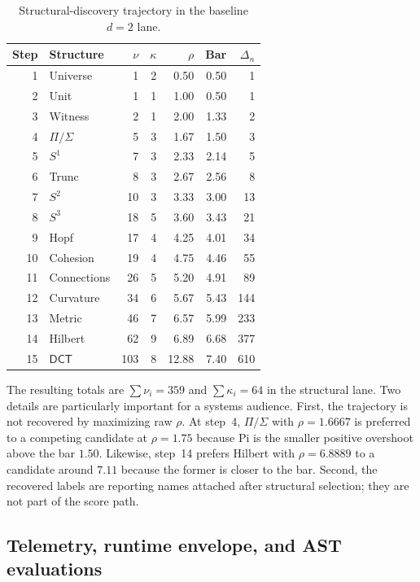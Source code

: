 \documentclass[pdflatex,sn-mathphys,Numbered]{sn-jnl}
\theoremstyle{thmstyleone}
\theoremstyle{thmstylethree}
\theoremstyle{thmstyletwo}
\newcommand{\DCT}{\ensuremath{\mathsf{DCT}}}
\newcommand{\Sone}{S^1}
\newcommand{\Stwo}{S^2}
\newcommand{\Sthree}{S^3}
\begin{document}
\begin{table}[p]
\centering
\caption{Structural-discovery trajectory in the baseline $d=2$ lane.}
\label{tab:trajectory}
\footnotesize
\begin{tabular}{@{}r l r r r r r@{}}
\toprule
Step & Structure & $\nu$ & $\kappa$ & $\rho$ & Bar & $\Delta_n$ \\
\midrule
1 & Universe & 1 & 2 & 0.50 & 0.50 & 1 \\
2 & Unit & 1 & 1 & 1.00 & 0.50 & 1 \\
3 & Witness & 2 & 1 & 2.00 & 1.33 & 2 \\
4 & $\Pi/\Sigma$ & 5 & 3 & 1.67 & 1.50 & 3 \\
5 & $\Sone$ & 7 & 3 & 2.33 & 2.14 & 5 \\
6 & Trunc & 8 & 3 & 2.67 & 2.56 & 8 \\
7 & $\Stwo$ & 10 & 3 & 3.33 & 3.00 & 13 \\
8 & $\Sthree$ & 18 & 5 & 3.60 & 3.43 & 21 \\
9 & Hopf & 17 & 4 & 4.25 & 4.01 & 34 \\
10 & Cohesion & 19 & 4 & 4.75 & 4.46 & 55 \\
11 & Connections & 26 & 5 & 5.20 & 4.91 & 89 \\
12 & Curvature & 34 & 6 & 5.67 & 5.43 & 144 \\
13 & Metric & 46 & 7 & 6.57 & 5.99 & 233 \\
14 & Hilbert & 62 & 9 & 6.89 & 6.68 & 377 \\
15 & \DCT{} & 103 & 8 & 12.88 & 7.40 & 610 \\
\bottomrule
\end{tabular}
\end{table}

The resulting totals are $\sum \nu_i = 359$ and $\sum \kappa_i = 64$ in the structural lane. Two details are particularly important for a systems audience. First, the trajectory is not recovered by maximizing raw $\rho$. At step~4, $\Pi/\Sigma$ with $\rho=1.6667$ is preferred to a competing candidate at $\rho=1.75$ because Pi is the smaller positive overshoot above the bar $1.50$. Likewise, step~14 prefers Hilbert with $\rho=6.8889$ to a candidate around $7.11$ because the former is closer to the bar. Second, the recovered labels are reporting names attached after structural selection; they are not part of the score path.

\subsection{Telemetry, runtime envelope, and AST evaluations}
\end{document}
